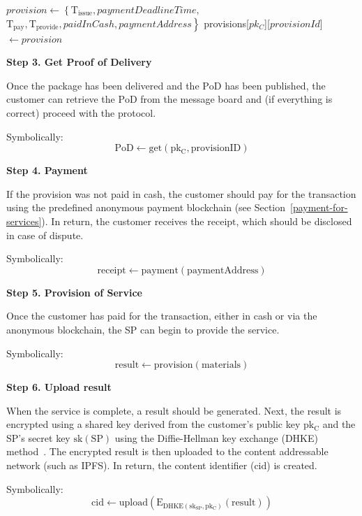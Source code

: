 \documentclass[pdftex,twocolumn,epjc3]{svjour3}
\begin{document}
{\begin{algorithm}
\begin{algorithmic}[1]
    \State $provision \gets \left\{ \mathrm{T}_\mathrm{issue}, paymentDeadlineTime, \right.$
    \State \hspace{\algorithmicindent}$\left. \mathrm{T}_\mathrm{pay}, \mathrm{T}_\mathrm{provide}, paidInCash, paymentAddress \right\}$
    \State provisions[$pk_C$][$provisionId$] $\gets provision$
\EndFunction
\end{algorithmic}
\end{algorithm}


\noindent \textbf
{Step 3. Get Proof of Delivery}\label{step-3-get-pod}

Once the package has been delivered and the $\mathrm{PoD}$ has been published, the customer can retrieve the $\mathrm{PoD}$ from the message board and (if everything is correct) proceed with the protocol.

Symbolically: 
\[
\mathrm{PoD \gets get(pk_C, provisionID)}
\]

\noindent \textbf
{Step 4. Payment}\label{step-4-payment}

If the provision was not paid in cash, the customer should pay for the transaction using the predefined anonymous payment blockchain (see Section~\ref{payment-for-services}).
In return, the customer receives the $\mathrm{receipt}$, which should be disclosed in case of dispute.

Symbolically: 
\[
\mathrm{receipt \gets payment(paymentAddress)}
\]

\noindent \textbf
{Step 5. Provision of Service}\label{step-5-provision-of-service} 

Once the customer has paid for the transaction, either in cash or via the anonymous blockchain, the SP can begin to provide the service.

Symbolically: 
\[
\mathrm{result \gets provision(materials)}
\]

\noindent \textbf
{Step 6. Upload result}\label{step-6-upload-result}

When the service is complete, a result should be generated. 
Next, the result is encrypted using a shared key derived from the customer's public key $\mathrm{pk_C}$ and the SP's secret key $\mathrm{sk(SP)}$ using the Diffie-Hellman key exchange (DHKE) method~\cite{diffieNewDirectionsCryptography1976}.
The encrypted result is then uploaded to the content addressable network (such as IPFS). In return, the content identifier ($\mathrm{cid}$) is created.

Symbolically: 
\[
\mathrm{cid \gets upload(E_{DHKE(sk_{SP}, pk_C)}(result))}
\]

}
\end{document}
